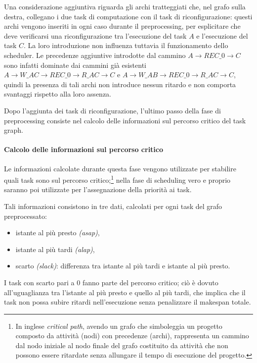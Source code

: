 Una considerazione 
aggiuntiva riguarda gli archi tratteggiati che, nel grafo sulla destra, 
collegano i due task di computazione con il task di riconfigurazione: questi 
archi vengono inseriti in ogni caso durante il preprocessing, per esplicitare 
che deve verificarsi una riconfigurazione tra l'esecuzione del task $A$ e 
l'esecuzione del task $C$. La loro introduzione non influenza tuttavia il 
funzionamento dello scheduler. Le precedenze aggiuntive introdotte dal cammino 
$A \rightarrow REC\_0 \rightarrow C$ sono infatti dominate dai cammini già 
esistenti $A \rightarrow W\_AC \rightarrow REC\_0 \rightarrow R\_AC \rightarrow 
C$ e $A \rightarrow W\_AB \rightarrow REC\_0 \rightarrow R\_AC \rightarrow C$, 
quindi la presenza di tali archi non introduce nessun ritardo e non comporta 
svantaggi rispetto alla loro assenza.

Dopo l'aggiunta dei task di riconfigurazione, l'ultimo passo della fase di 
preprocessing consiste nel calcolo delle informazioni sul percorso critico del 
task graph.


\paragraph{Calcolo delle informazioni sul percorso critico}
\label{par:percorsoCritico}
Le informazioni calcolate durante questa fase vengono utilizzate per stabilire 
quali task sono sul percorso critico;\footnote{In inglese \emph{critical path}, 
avendo un grafo che simboleggia un progetto composto da attività (nodi) con 
precedenze (archi), rappresenta un cammino dal nodo iniziale al nodo finale del 
grafo costituito da attività che non possono essere ritardate senza allungare 
il tempo di esecuzione del progetto.} nella fase di scheduling vero e proprio
saranno poi utilizzate per l'assegnazione della priorità ai task.

Tali informazioni consistono in tre dati, calcolati per ogni task del grafo 
preprocessato:
\begin{itemize}
 \item istante al più presto \emph{(asap)},
 \item istante al più tardi \emph{(alap)},
 \item scarto \emph{(slack)}: differenza tra istante al più tardi e istante al 
più presto.
\end{itemize}
I task con scarto pari a $0$ fanno parte del percorso critico; ci\`o \`e dovuto
all'uguaglianza tra l'istante al pi\`u presto e quello al pi\`u tardi, che implica che
il task non possa subire ritardi nell'esecuzione senza penalizzare il makespan totale.

